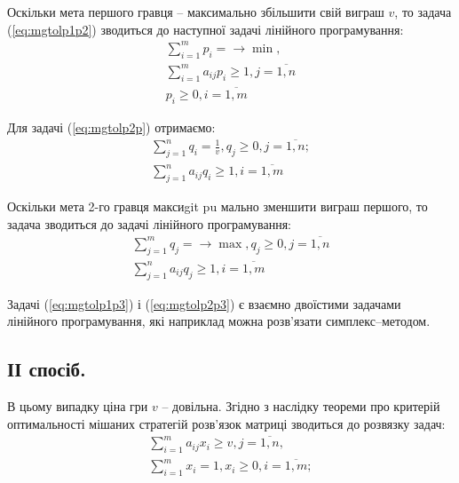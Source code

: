 \documentclass[12pt,a4paper]{book}
\begin{document}
Оскільки мета першого гравця – максимально збільшити свій виграш $v$, то задача (\ref{eq:mgtolp1p2}) зводиться до наступної задачі лінійного програмування:
\begin{equation}
\begin{array}{l}
\displaystyle \sum_{i=1}^m p_i = \to \min,\\
\displaystyle \sum_{i=1}^m a_{ij} p_i \ge 1,  j=\overline{1,n}\\
p_i \ge 0, i=\overline{1,m}
\end{array}
\label{eq:mgtolp1p3}
\end{equation}

Для задачі (\ref{eq:mgtolp2p}) отримаємо:
\begin{equation}
\begin{array}{l}
\displaystyle \sum_{j=1}^n q_i = \frac{1}{v}, q_j \ge 0, j=\overline{1,n};\\
\displaystyle \sum_{j=1}^n a_{ij} q_i \ge 1,  i=\overline{1,m}
\end{array}
\label{eq:mgtolp2p2}
\end{equation}

Оскільки мета 2-го гравця максиgit pu	мально зменшити виграш першого, то задача зводиться до задачі лінійного програмування:
\begin{equation}
\begin{array}{l}
\displaystyle \sum_{j=1}^m q_j = \to \max, q_j \ge 0, j=\overline{1,n}\\
\displaystyle \sum_{j=1}^n a_{ij} q_j \ge 1,  i=\overline{1,m}
\end{array}
\label{eq:mgtolp2p3}
\end{equation}

Задачі (\ref{eq:mgtolp1p3}) і (\ref{eq:mgtolp2p3}) є взаємно двоїстими задачами лінійного програмування, які наприклад можна розв’язати симплекс–методом.

\subsection{ІІ спосіб.}

В цьому випадку ціна гри $v$ – довільна. Згідно з наслідку теореми про критерій оптимальності мішаних стратегій розв’язок матриці зводиться до розвязку задач:
\begin{equation}
\begin{array}{l}
\displaystyle \sum_{i=1}^m a_{ij} x_i \ge v,  j=\overline{1,n},\\
\displaystyle \sum_{i=1}^m x_i = 1, x_i \ge 0, i=\overline{1,m};
\end{array}
\label{eq:mgtolp2w1p}
\end{equation}
\end{document}
